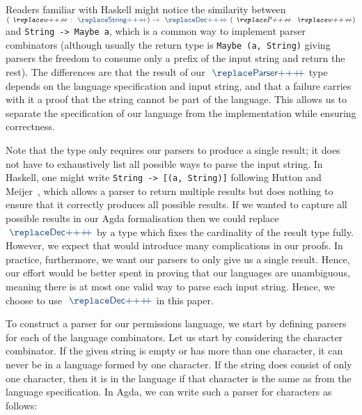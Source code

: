 \begin{remark}
Readers familiar with Haskell might notice the similarity between $\as{(}\ab{w}~\as{:}~\af{String}\as{)}~\as{→}~\af{Dec}~\as{(}\ab{P}~\ab{w}\as{)}$ and \verb|String -> Maybe a|, which is a common way to implement parser combinators (although usually the return type is \verb|Maybe (a, String)| giving parsers the freedom to consume only a prefix of the input string and return the rest).
The differences are that the result of our $\af{Parser}$ type depends on the language specification and input string, and that a failure carries with it a proof that the string cannot be part of the language.
This allows us to separate the specification of our language from the implementation while ensuring correctness.
\end{remark}

\begin{remark}
Note that the  type only requires our parsers to produce a single
result; it does not have to exhaustively list all possible ways to parse the
input string. In Haskell, one might write \verb|String -> [(a, String)]| following Hutton and Meijer~\cite{monadic-parsing}, which allows a parser to return
multiple results but does nothing to ensure that it correctly produces all
possible results.
If we wanted to capture all possible results in our Agda formalisation then we
could replace $\af{Dec}$ by a type which fixes the cardinality of the result
type fully.
However, we expect that would introduce many complications in our proofs.
In practice, furthermore, we want our parsers to only give us a single result.
Hence, our effort would be better spent in proving that our languages are
unambiguous, meaning there is at most one valid way to parse each input string.
Hence, we choose to use $\af{Dec}$ in this paper.
\end{remark}

To construct a parser for our permissions language, we start by defining parsers for each of the language combinators. Let us start by considering the character combinator. If the given string is empty or has more than one character, it can never be in a language formed by one character. If the string does consist of only one character, then it is in the language if that character is the same as from the language specification. In Agda, we can write such a parser for characters as follows:

